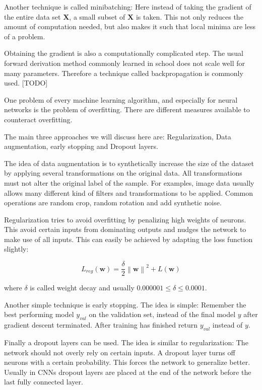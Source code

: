 \documentclass[draft,final,oneside]{vutinfth} %
\newcommand{\norm}[1]{\left\lVert#1\right\rVert}
\begin{document}
Another technique is called minibatching: Here instead of taking the gradient of the entire data set $\boldsymbol{X}$, a small subset of $\boldsymbol{X}$ is taken. This not only reduces the amount of computation needed, but also makes it such that local minima are less of a problem.

Obtaining the gradient is also a computationally complicated step. The usual forward derivation method commonly learned in school does not scale well for many parameters. Therefore a technique called backpropagation is commonly used. [TODO]

One problem of every machine learning algorithm, and especially for neural networks is the problem of overfitting. There are different measures available to counteract overfitting.

The main three approaches we will discuss here are: Regularization, Data augmentation, early stopping and Dropout layers. 

The idea of data augmentation is to synthetically increase the size of the dataset by applying several transformations on the original data. All transformations must not alter the original label of the sample. For examples, image data usually allows many different kind of filters and transformations to be applied. Common operations are random crop, random rotation and add synthetic noise.

Regularization tries to avoid overfitting by penalizing	high weights of neurons. This avoid certain inputs from dominating outputs and nudges the network to make use of all inputs. This can easily be achieved by adapting the loss function slightly:

\begin{equation}
L_{reg}(\boldsymbol{w}) = \dfrac{\delta}{2}\norm{\boldsymbol{w}}^2 + L(\boldsymbol{w})
\end{equation}

where $\delta$ is called weight decay and usually $0.000001 \leq \delta \leq 0.0001$.

Another simple technique is early stopping. The idea is simple: Remember the best performing model $y_{val}$ on the validation set, instead of the final model $y$ after gradient descent terminated. After training has finished return $y_{val}$ instead of $y$.

Finally a dropout layers can be used. The idea is similar to regularization: The network should not overly rely on certain inputs. A dropout layer turns off neurons with a certain probability. This forces the network to generalize better. Usually in CNNs dropout layers are placed at the end of the network before the last fully connected layer.
\end{document}
